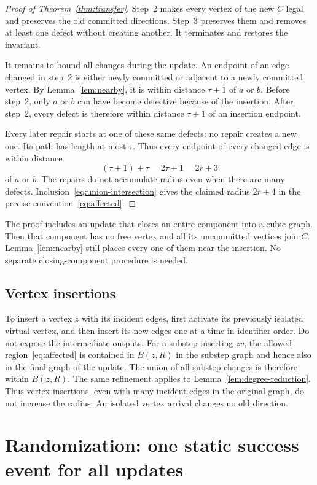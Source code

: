\documentclass[11pt]{article}
\theoremstyle{definition}
\begin{document}
\begin{proof}[Proof of Theorem~\ref{thm:transfer}]
Step~2 makes every vertex of the new $C$ legal and preserves the old
committed directions. Step~3 preserves them and removes at least one defect
without creating another. It terminates and restores the invariant.

It remains to bound all changes during the update. An endpoint of an edge
changed in step~2 is either newly committed or adjacent to a newly committed
vertex. By Lemma~\ref{lem:nearby}, it is within distance $\tau+1$ of $a$ or
$b$. Before step~2, only $a$ or $b$ can have become defective because of
the insertion. After step~2, every defect is therefore within distance
$\tau+1$ of an insertion endpoint.

Every later repair starts at one of these same defects: no repair creates a
new one. Its path has length at most $\tau$. Thus every endpoint of every
changed edge is within distance
\[
 (\tau+1)+\tau=2\tau+1=2r+3
\]
of $a$ or $b$. The repairs do not accumulate radius even when there are
many defects. Inclusion~\eqref{eq:union-intersection} gives the claimed
radius $2r+4$ in the precise convention~\eqref{eq:affected}.
\end{proof}

The proof includes an update that closes an entire component into a cubic
graph. Then that component has no free vertex and all its uncommitted
vertices join $C$. Lemma~\ref{lem:nearby} still places every one of them
near the insertion. No separate closing-component procedure is needed.

\subsection{Vertex insertions}\label{sec:vertices}

To insert a vertex $z$ with its incident edges, first activate its previously
isolated virtual vertex, and then insert its new edges one at a time in
identifier order. Do not expose the intermediate outputs. For a substep
inserting $zv$, the allowed region~\eqref{eq:affected} is contained in
$B(z,R)$ in the substep graph and hence also in the final graph of the
update. The union of all substep changes is therefore within $B(z,R)$.
The same refinement applies to Lemma~\ref{lem:degree-reduction}. Thus vertex
insertions, even with many incident edges in the original graph, do not
increase the radius. An isolated vertex arrival changes no old direction.

\section{Randomization: one static success event for all updates}
\label{sec:random-transfer}
\end{document}
